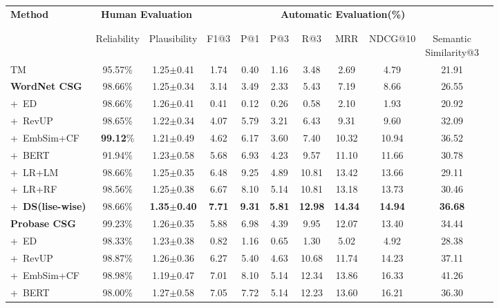 \begin{table}[th]
	\small
	\centering
		\begin{tabular}{lc cc c c c c c cc}
			\toprule
			\multirow{3}{*}{\textbf{Method}} &\multicolumn{2}{c|}{\textbf{Human Evaluation}} &\multicolumn{7}{c}{\textbf{Automatic Evaluation(\%)}} \\
			\\ [-1.8ex]
			\cline{2-10}
			\\ [-1.8ex]
			& Reliability & Plausibility  &F1@3 & P@1 & P@3 &R@3 & MRR & NDCG@10 & \tabincell{c}{Semantic \\ Similarity@3}\\
			\midrule
			TM &95.57\%  &1.25$\pm$0.41 &1.74 &0.40  &1.16  &3.48   &2.69  &4.79  &21.91 \\
			\midrule
			\textbf{WordNet CSG} &98.66\% &1.25$\pm$0.34 &3.14 &3.49 &2.33 &5.43 &7.19 &8.66 &26.55 \\
			+~ED &98.66\% &1.26$\pm$0.41  &0.41 &0.12  &0.26  &0.58  &2.10  &1.93  &20.92 \\
			+~RevUP &98.65\%  &1.22$\pm$0.34  &4.07 &5.79  &3.21  &6.43 &9.31  &9.60  &32.09 \\
			+~EmbSim+CF &\textbf{99.12}\%  &1.21$\pm$0.49  &4.62  &6.17  &3.60  &7.40  &10.32  &10.94  &36.52 \\
			+~BERT &91.94\% &1.23$\pm$0.58  &5.68 &6.93  &4.23  &9.57  &11.10  &11.66  &30.78 \\
			+~LR+LM &98.66\%  &1.25$\pm$0.35 &6.48 &9.25  &4.89 &10.81   &13.42 &13.66 &29.11\\
			+~LR+RF &98.56\%  &1.25$\pm$0.38 &6.67 &8.10 &5.14 &10.81   &13.18 &13.73 &30.46 \\
			+~\textbf{DS(lise-wise)} &98.66\%  &\textbf{1.35$\pm$0.40}   &\textbf{7.71} &\textbf{9.31} &\textbf{5.81} &\textbf{12.98} &\textbf{14.34} &\textbf{14.94} &\textbf{36.68} \\
			\midrule
			\textbf{Probase CSG} &99.23\% &1.26$\pm$0.35 &5.88 &6.98 &4.39 &9.95  &12.07 &13.40 &34.44 \\
			+~ED &98.33\%  &1.23$\pm$0.38  &0.82 &1.16  &0.65  &1.30  &5.02  &4.92  &28.38 \\
			+~RevUP &98.87\%  &1.26$\pm$0.36  &6.27 &5.40  &4.63  &10.68  &11.74  &14.23  &37.11 \\
			+~EmbSim+CF &98.98\%  &1.19$\pm$0.47  &7.01 &8.10  &5.14  &12.34  &13.86  &16.33  &41.26 \\
			+~BERT &98.00\% &1.27$\pm$0.58  &7.05 &7.72  &5.14  &12.23  &13.60  &16.21  &36.30 \\

\end{tabular}
\end{table}
